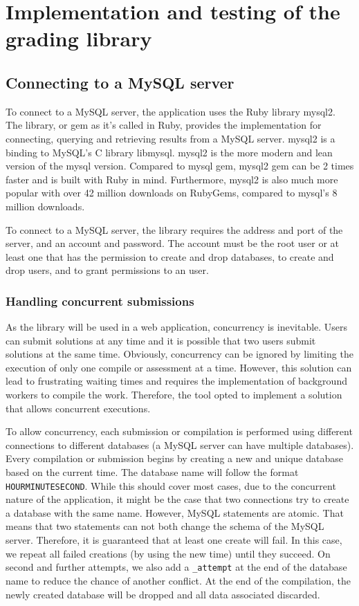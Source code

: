 \chapter{Implementation and testing of the grading library}

\section{Connecting to a MySQL server} \label{ch:impllib:sec:connecting}
To connect to a MySQL server, the application uses the Ruby library mysql2. The library, or gem as it's called in Ruby, provides the implementation for connecting, querying and retrieving results from a MySQL server. mysql2 is a binding to MySQL's C library libmysql. mysql2 is the more modern and lean version of the mysql version. Compared to mysql gem, mysql2 gem can be 2 times faster and is built with Ruby in mind. Furthermore, mysql2 is also much more popular with over 42 million downloads on RubyGems, compared to mysql's 8 million downloads.

To connect to a MySQL server, the library requires the address and port of the server, and an account and password. The account must be the root user or at least one that has the permission to create and drop databases, to create and drop users, and to grant permissions to an user.

\subsection{Handling concurrent submissions}

As the library will be used in a web application, concurrency is inevitable. Users can submit solutions at any time and it is possible that two users submit solutions at the same time. Obviously, concurrency can be ignored by limiting the execution of only one compile or assessment at a time. However, this solution can lead to frustrating waiting times and requires the implementation of background workers to compile the work. Therefore, the tool opted to implement a solution that allows concurrent executions.

To allow concurrency, each submission or compilation is performed using different connections to different databases (a MySQL server can have multiple databases).  Every compilation or submission begins by creating a new and unique database based on the current time. The database name will follow the format \texttt{HOURMINUTESECOND}. While this should cover most cases, due to the concurrent nature of the application, it might be the case that two connections try to create a database with the same name. However, MySQL statements are atomic. That means that two statements can not both change the schema of the MySQL server. Therefore, it is guaranteed that at least one create will fail. In this case, we repeat all failed creations (by using the new time) until they succeed. On second and further attempts, we also add a \texttt{_attempt} at the end of the database name to reduce the chance of another conflict. At the end of the compilation, the newly created database will be dropped and all data associated discarded.

